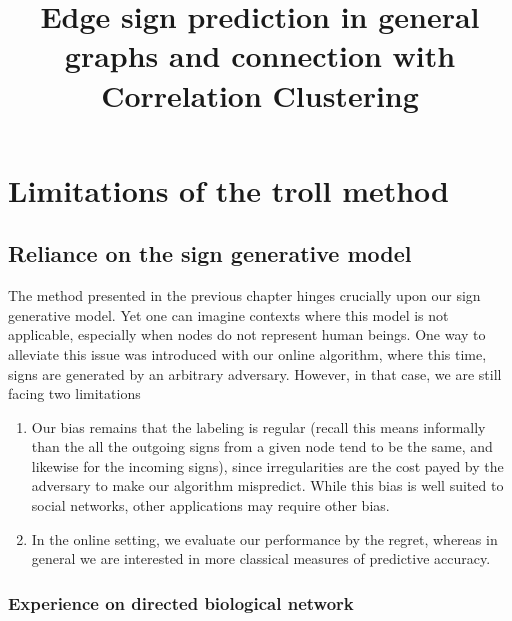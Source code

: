 \documentclass[nobib, a4paper, 10pt, oneside, onecolumn, openany, notitlepage, final,
svgnames, marginals=raggedouter, english,
]{article}
\title{Edge sign prediction in general graphs and connection with Correlation Clustering}
\begin{document}
\maketitle

% 

\section{Limitations of the troll method}
\label{sec:limitations_of_the_troll_method}

\subsection{Reliance on the sign generative model}
\label{sub:reliance_on_the_sign_generative_model}

The method presented in the previous chapter hinges crucially upon our sign generative model. Yet
one can imagine contexts where this model is not applicable, especially when nodes do not represent
human beings. One way to alleviate this issue was introduced with our online algorithm, where this
time, signs are generated by an arbitrary adversary. However, in that case, we are still facing two
limitations
\begin{enumerate}
	\item Our bias remains that the labeling is regular (recall this means informally than the all
		the outgoing signs from a given node tend to be the same, and likewise for the incoming signs),
		since irregularities are the cost payed by the adversary to make our algorithm mispredict. While
		this bias is well suited to social networks, other applications may require other
		bias.
	\item In the online setting, we evaluate our performance by the regret,
		whereas in general we are interested in more classical measures of predictive accuracy.
\end{enumerate}

\subsubsection{Experience on directed biological network}
\label{ssub:experience_on_directed_biological_network}
\end{document}
